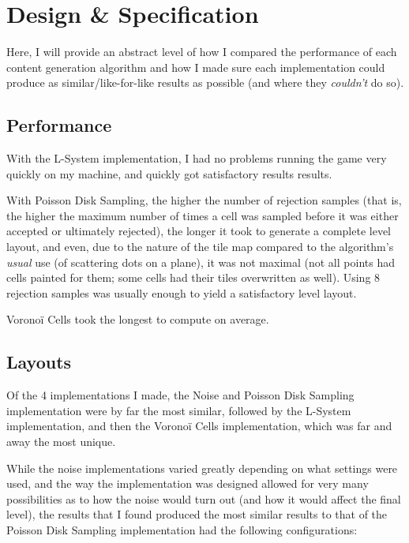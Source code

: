 \chapter{Design \& Specification}
  
% 

Here, I will provide an abstract level of how I compared the performance of each content generation algorithm and how I made sure each implementation could produce as similar/like-for-like results as possible (and where they \textit{couldn't} do so).

\section{Performance}

With the L-System implementation, I had no problems running the game very quickly on my machine, and quickly got satisfactory results results.

With Poisson Disk Sampling, the higher the number of rejection samples (that is, the higher the maximum number of times a cell was sampled before it was either accepted or ultimately rejected), the longer it took to generate a complete level layout, and even, due to the nature of the tile map compared to the algorithm's \textit{usual} use (of scattering dots on a plane), it was not maximal (not all points had cells painted for them; some cells had their tiles overwritten as well). Using 8 rejection samples was usually enough to yield a satisfactory level layout.

Voronoï Cells took the longest to compute on average. 

\section{Layouts}

Of the 4 implementations I made, the Noise and Poisson Disk Sampling implementation were by far the most similar, followed by the L-System implementation, and then the Voronoï Cells implementation, which was far and away the most unique.

While the noise implementations varied greatly depending on what settings were used, and the way the implementation was designed allowed for very many possibilities as to how the noise would turn out (and how it would affect the final level), the results that I found produced the most similar results to that of the Poisson Disk Sampling implementation had the following configurations:

